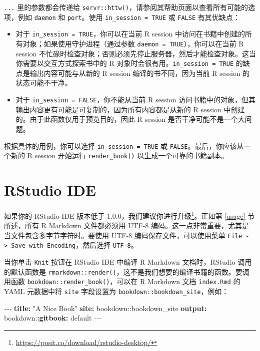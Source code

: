 \documentclass[
  12pt,
]{krantz}
\newenvironment{Shaded}{\begin{snugshade}}{\end{snugshade}}
\newcommand{\AttributeTok}[1]{\textcolor[rgb]{0.13,0.29,0.53}{#1}}
\newcommand{\FunctionTok}[1]{\textcolor[rgb]{0.13,0.29,0.53}{\textbf{#1}}}
\newcommand{\KeywordTok}[1]{\textcolor[rgb]{0.13,0.29,0.53}{\textbf{#1}}}
\newcommand{\PreprocessorTok}[1]{\textcolor[rgb]{0.56,0.35,0.01}{\textit{#1}}}
\newcommand{\StringTok}[1]{\textcolor[rgb]{0.31,0.60,0.02}{#1}}
\providecommand{\tightlist}{%
  \setlength{\itemsep}{0pt}\setlength{\parskip}{0pt}}
\renewcommand{\href}[2]{#2\footnote{\url{#1}}}
\theoremstyle{definition}
\theoremstyle{definition}
\theoremstyle{definition}
\theoremstyle{definition}
\theoremstyle{remark}
\begin{document}
\texttt{...} 里的参数都会传递给 \texttt{servr::httw()}，请参阅其帮助页面以查看所有可能的选项，例如 \texttt{daemon} 和 \texttt{port}。使用 \texttt{in\_session\ =\ TRUE} 或 \texttt{FALSE} 有其优缺点：

\begin{itemize}
\tightlist
\item
  对于 \texttt{in\_session\ =\ TRUE}，你可以在当前 R session 中访问在书籍中创建的所有对象；如果使用守护进程（通过参数 \texttt{daemon\ =\ TRUE}），你可以在当前 R session 不忙碌时检查对象；否则必须先停止服务器，然后才能检查对象。这当你需要以交互方式探索书中的 R 对象时会很有用。\texttt{in\_session\ =\ TRUE} 的缺点是输出内容可能与从新的 R session 编译的书不同，因为当前 R session 的状态可能不干净。
\item
  对于 \texttt{in\_session\ =\ FALSE}，你不能从当前 R session 访问书籍中的对象，但其输出内容更有可能是可复制的，因为所有内容都是从新的 R session 中创建的。由于此函数仅用于预览目的，因此 R session 是否干净可能不是一个大问题。
\end{itemize}

根据具体的用例，你可以选择 \texttt{in\_session\ =\ TRUE} 或 \texttt{FALSE}。最后，你应该从一个新的 R session 开始运行 \texttt{render\_book()} 以生成一个可靠的书籍副本。

\hypertarget{rstudio-ide}{%
\section{RStudio IDE}\label{rstudio-ide}}

如果你的 RStudio IDE 版本低于 1.0.0，我们建议你进行\href{https://posit.co/download/rstudio-desktop/}{升级}。正如第 \ref{usage} 节所述，所有 R Markdown 文件都必须用 UTF-8 编码。这一点非常重要，尤其是当文件包含多字节字符时。要使用 UTF-8 编码保存文件，可以使用菜单 \texttt{File\ -\textgreater{}\ Save\ with\ Encoding}，然后选择 \texttt{UTF-8}。

当你单击 \texttt{Knit} 按钮在 RStudio IDE 中编译 R Markdown 文档时，RStudio 调用的默认函数是 \texttt{rmarkdown::render()}，这不是我们想要的编译书籍的函数。要调用函数 \texttt{bookdown::render\_book()}，可以在 R Markdown 文档 \texttt{index.Rmd} 的 YAML 元数据中将 \texttt{site} 字段设置为 \texttt{bookdown::bookdown\_site}，例如：

\begin{Shaded}
\begin{Highlighting}[]
\PreprocessorTok{{-}{-}{-}}
\FunctionTok{title}\KeywordTok{:}\AttributeTok{ }\StringTok{"A Nice Book"}
\FunctionTok{site}\KeywordTok{:}\AttributeTok{ bookdown::bookdown\_site}
\FunctionTok{output}\KeywordTok{:}
\AttributeTok{  bookdown:}\FunctionTok{:gitbook}\KeywordTok{:}\AttributeTok{ default}
\PreprocessorTok{{-}{-}{-}}
\end{Highlighting}
\end{Shaded}
\end{document}
